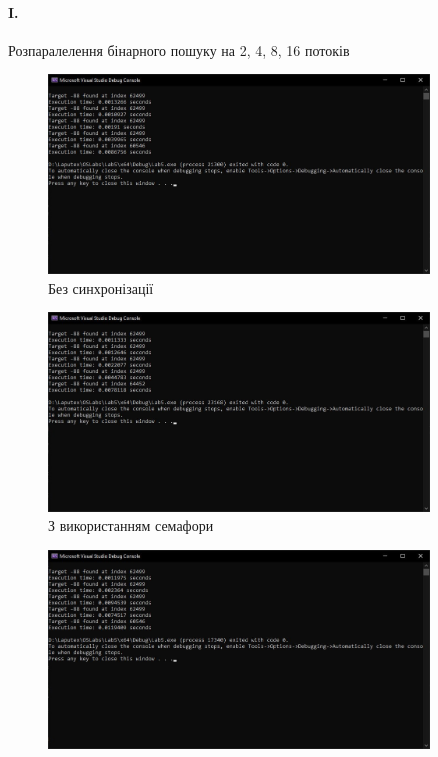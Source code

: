\documentclass[12pt]{extarticle}
\begin{document}
\paragraph{I.} Розпаралелення бінарного пошуку на 2, 4, 8, 16 потоків
\begin{figure}[H]
    \centering
    \includegraphics[width=0.90\textwidth]{no_sync.jpg}
    \caption{Без синхронізації}
\end{figure}
\begin{figure}[H]
    \centering
    \includegraphics[width=0.90\textwidth]{semaphore.jpg}
    \caption{З використанням семафори}
\end{figure}
\begin{figure}[H]
    \centering
    \includegraphics[width=0.90\textwidth]{monitor.jpg}
    \caption{}
\end{figure}
\end{document}
